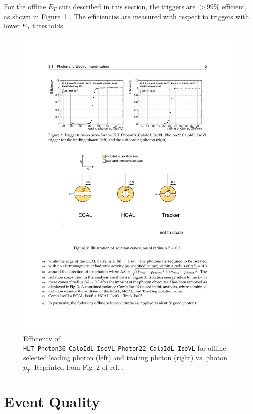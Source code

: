 \documentclass[dissertation.tex]{subfiles}
\begin{document}
\marginpar{\textcolor{blue}{Added HLT efficiency discussion}}For the offline $E_{T}$ cuts described in this section, the triggers are $>99\%$ efficient, as shown in Figure~\ref{fig:HLT_efficiency} \cite{CMS_AN-2011-515}.  The efficiencies are measured with respect to triggers with lower $E_{T}$ thresholds.

\begin{figure}
	\centering
	\includegraphics[scale=0.95]{HLT_efficiency}
	\caption{Efficiency of \texttt{HLT\_Photon36\_CaloIdL\_IsoVL\_Photon22\_CaloIdL\_IsoVL} for offline selected leading photon (left) and trailing photon (right) vs. photon $p_{T}$.  Reprinted from Fig. 2 of ref. \cite{CMS_AN-2011-515}.}
	\label{fig:HLT_efficiency}
\end{figure}

\section{Event Quality}
\label{sec:Event Quality}
\end{document}
